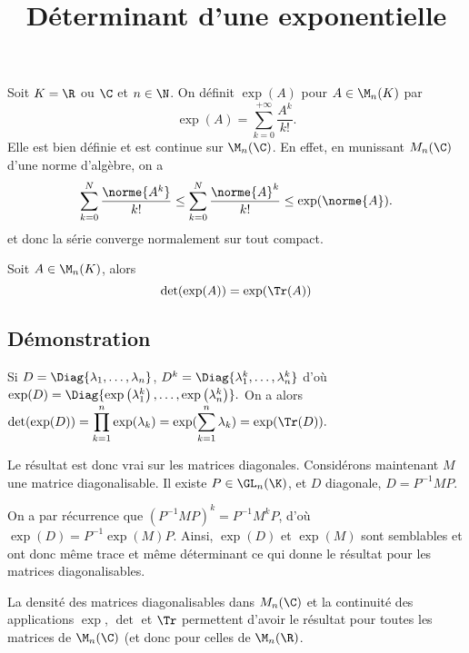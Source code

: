 \documentclass[fontsize=12pt,twoside=false,parskip=half,french]{scrartcl}
\title{Déterminant d'une exponentielle}
\date{}
\author{}
\begin{document}
\maketitle
   Soit $K = \R$ ou $\C$ et $n \in \N$. On définit $\exp(A)$ pour $A \in \M_n(K)$
   par
   \[
      \exp(A) = \sum_{k = 0}^{+\infty} \frac{A^k}{k!}.
   \]
   Elle est bien définie et est continue sur $\M_n(\C)$. En effet, en munissant
   $M_n(\C)$ d'une norme d'algèbre, on a
   \[
     \sum_{k = 0}^{N} \frac{\norme{A^k}}{k!} \leq \sum_{k = 0}^{N} \frac{\norme{A}^k}{k!}
     \leq \exp(\norme{A}).
   \]
   et donc la série converge normalement sur tout compact.
   \begin{Theoreme}
      Soit $A \in \M_n(K)$, alors
      \[
        \det(\exp(A)) = \exp(\Tr(A))
      \]
   \end{Theoreme}
   \subsection{Démonstration}
      Si $D = \Diag{\lambda_1,\ldots, \lambda_n}$, $D^k = \Diag{\lambda_1^k, \ldots, \lambda_n^k}$ d'où
      $\exp(D) = \Diag{\exp\left(\lambda_1^k\right), \ldots, \exp\left(\lambda_n^k\right)}.
      $
      On a alors 
      $\displaystyle \det(\exp(D)) = \prod_{k = 1}^n \exp(\lambda_k) 
                                   = \exp(\sum_{k = 1}^n \lambda_k)
                                   = \exp(\Tr(D)).
      $
      
      Le résultat est donc vrai sur les matrices diagonales. Considérons maintenant $M$ une matrice diagonalisable. Il existe $P \in \GL_n(\K)$,
      et $D$ diagonale, $D = P^{-1}MP$.
      
      On a par récurrence que $(P^{-1}MP)^k = P^{-1}M^kP$, d'où $\exp(D) = P^{-1}\exp(M)P$.
      Ainsi, $\exp(D)$ et $\exp(M)$ sont semblables et ont donc même trace 
      et même déterminant ce qui donne le résultat pour les matrices diagonalisables.

      La densité des matrices diagonalisables dans $M_n(\C)$ et la continuité
      des applications $\exp$, $\det$ et $\Tr$ permettent d'avoir le résultat
      pour toutes les matrices de $\M_n(\C)$ (et donc pour celles de $\M_n(\R)$.
      
      
\end{document}
